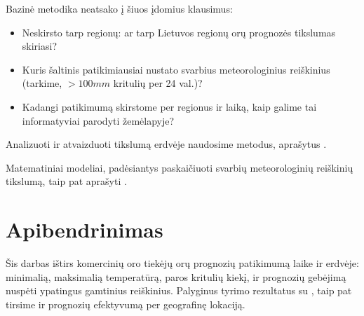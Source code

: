 \documentclass{article}
\begin{document}
Bazinė metodika neatsako į šiuos įdomius klausimus:

\begin{itemize}
    \item Neskirsto tarp regionų: ar tarp Lietuvos regionų orų prognozės
        tikslumas skiriasi?
    \item Kuris šaltinis patikimiausiai nustato svarbius meteorologinius
        reiškinius (tarkime, $>100mm$ kritulių per 24 val.)?
    \item Kadangi patikimumą skirstome per regionus ir laiką, kaip galime tai
        informatyviai parodyti žemėlapyje?
\end{itemize}

Analizuoti ir atvaizduoti tikslumą erdvėje naudosime metodus, aprašytus
\cite{verification2015}.

Matematiniai modeliai, padėsiantys paskaičiuoti svarbių meteorologinių
reiškinių tikslumą, taip pat aprašyti \cite{verification2015}.

\section{Apibendrinimas}

Šis darbas ištirs komercinių oro tiekėjų orų prognozių patikimumą laike ir
erdvėje: minimalią, maksimalią temperatūrą, paros kritulių kiekį, ir prognozių
gebėjimą nuspėti ypatingus gamtinius reiškinius. Palyginus tyrimo rezultatus su
\cite{rose2017analysis}, taip pat tirsime ir prognozių efektyvumą per
geografinę lokaciją.

\printbibliography
\end{document}
